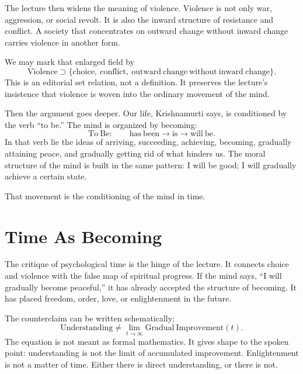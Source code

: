 The lecture then widens the meaning of violence. Violence is not only war, aggression, or social revolt. It is also the inward structure of resistance and conflict. A society that concentrates on outward change without inward change carries violence in another form.

We may mark that enlarged field by
\begin{equation}
\mathrm{Violence} \supset
\{\mathrm{choice},\ \mathrm{conflict},\ \mathrm{outward\ change\ without\ inward\ change}\}.
\end{equation}
This is an editorial set relation, not a definition. It preserves the lecture's insistence that violence is woven into the ordinary movement of the mind.

Then the argument goes deeper. Our life, Krishnamurti says, is conditioned by the verb ``to be.'' The mind is organized by becoming:
\begin{equation}
\mathrm{To\ Be}:\qquad
\mathrm{has\ been} \longrightarrow
\mathrm{is} \longrightarrow
\mathrm{will\ be}.
\end{equation}
In that verb lie the ideas of arriving, succeeding, achieving, becoming, gradually attaining peace, and gradually getting rid of what hinders us. The moral structure of the mind is built in the same pattern: I will be good; I will gradually achieve a certain state.

That movement is the conditioning of the mind in time.

\section{Time As Becoming}

The critique of psychological time is the hinge of the lecture. It connects choice and violence with the false map of spiritual progress. If the mind says, ``I will gradually become peaceful,'' it has already accepted the structure of becoming. It has placed freedom, order, love, or enlightenment in the future.

The counterclaim can be written schematically:
\begin{equation}
\mathrm{Understanding} \neq
\lim_{t\to\infty}\mathrm{Gradual\ Improvement}(t).
\end{equation}
The equation is not meant as formal mathematics. It gives shape to the spoken point: understanding is not the limit of accumulated improvement. Enlightenment is not a matter of time. Either there is direct understanding, or there is not.

